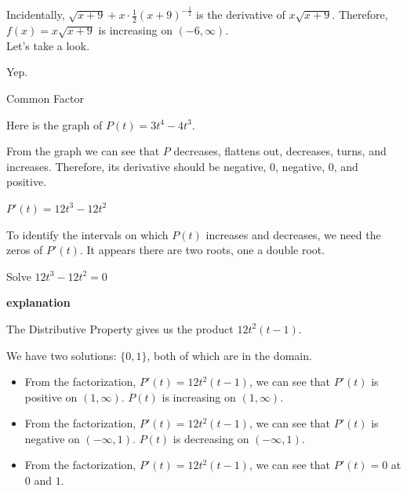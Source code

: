 \documentclass{ximera}
\begin{document}
Incidentally, $\sqrt{x+9} + x \cdot \frac{1}{2} (x+9)^{-\tfrac{1}{2}}$ is the derivative of $x \sqrt{x+9}$. Therefore, $f(x) = x \sqrt{x+9}$ is increasing on $(-6, \infty)$. \\

Let's take a look.







\begin{center}
\end{center}


Yep.








\begin{example}  Common Factor


Here is the graph of $P(t) = 3 t^4 - 4 t^3$.



\begin{center}
\end{center}


From the graph we can see that $P$ decreases, flattens out, decreases, turns, and increases.  Therefore, its derivative should be negative, $0$, negative, $0$, and positive. 



$P'(t) = 12 t^3 - 12 t^2$ 




\begin{center}
\end{center}



To identify the intervals on which $P(t)$ increases and decreases, we need the zeros of $P'(t)$.  It appears there are two roots, one a double root.






Solve $12 t^3 - 12 t^2 = 0$


\textbf{\textcolor{red!75!green}{explanation}} 

The Distributive Property gives us the product $12 t^2 (t-1)$.




We have two solutions: $\{ 0, 1  \}$, both of which are in the domain.




\begin{itemize}
\item From the factorization, $P'(t) = 12 t^2 (t-1)$, we can see that $P'(t)$ is positive on $(1, \infty)$. $P(t)$ is increasing on $(1, \infty)$. \\
\item From the factorization, $P'(t) = 12 t^2 (t-1)$, we can see that $P'(t)$ is negative on $(-\infty, 1)$. $P(t)$ is decreasing on $(-\infty, 1)$. \\
\item From the factorization, $P'(t) = 12 t^2 (t-1)$, we can see that $P'(t) = 0$ at $0$ and $1$. \\
\end{itemize}





\end{example}
\end{document}
